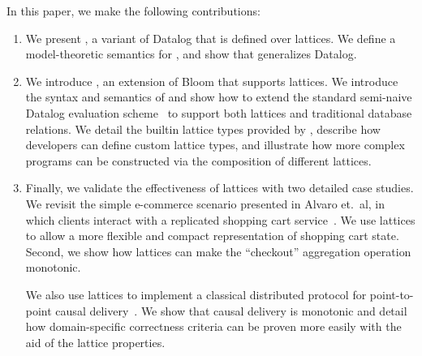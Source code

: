In this paper, we make the following contributions:
\begin{enumerate}
\item
  We present \baselang, a variant of Datalog that is defined over lattices. We
  define a model-theoretic semantics for \baselang, and show that \baselang
  generalizes Datalog.

\item
  We introduce \lang, an extension of Bloom that supports lattices. We introduce
  the syntax and semantics of \lang and show how to extend the standard
  semi-naive Datalog evaluation scheme~\cite{Balbin1987} to support both
  lattices and traditional database relations. We detail the builtin lattice
  types provided by \lang, describe how developers can define custom lattice
  types, and illustrate how more complex programs can be constructed via the
  composition of different lattices.

\item
  Finally, we validate the effectiveness of lattices with two detailed case
  studies. We revisit the simple e-commerce scenario presented in Alvaro et.\
  al, in which clients interact with a replicated shopping cart
  service~\cite{Alvaro2011}. We use lattices to allow a more flexible and
  compact representation of shopping cart state. Second, we show how lattices
  can make the ``checkout'' aggregation operation monotonic.

  We also use lattices to implement a classical distributed protocol for
  point-to-point causal delivery~\cite{Schiper1989}. We show that causal
  delivery is monotonic and detail how domain-specific correctness criteria can
  be proven more easily with the aid of the lattice properties.
\end{enumerate}
